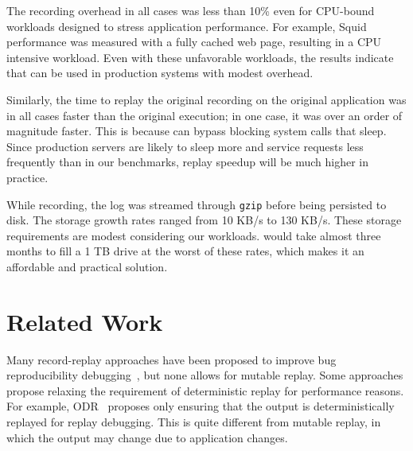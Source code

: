 The recording overhead in all cases was less than
10\% even for CPU-bound workloads designed to stress application
performance. For example, Squid performance was measured with a fully
cached web page, resulting in a CPU
intensive workload. Even with these unfavorable workloads, the results indicate
that {\dora} can be used in production systems with modest overhead.

Similarly, the time to replay the original recording on the original application
was in all cases faster than the original execution; in one case, it was over an
order of magnitude faster.
This is because {\dora} can bypass blocking system calls that sleep.
Since production servers are likely to sleep more and
service requests less frequently than in our benchmarks, replay
speedup will be much higher in practice.

While recording, the log was streamed through {\tt gzip} before being persisted to
disk. The storage growth rates ranged from 10 KB/s to 130 KB/s. These
storage requirements are modest considering our workloads. {\dora}
would take almost three months to fill a 1 TB drive at the worst
of these rates, which makes it an affordable and practical solution.

\section{Related Work}
\label{dora:sec:related}

Many record-replay approaches have been proposed to improve bug 
reproducibility
debugging~\cite{idna:vee06,decouple:usenix08,instant-replay,r2:osdi,odr:sosp09,pinsel:pldi07,pres:sosp09,jockey,srinivasan:flashback,subhraveti:sigmetrics11},
but none allows for mutable replay. Some
approaches
propose relaxing the requirement of deterministic replay for performance
reasons. For example, ODR~\cite{odr:sosp09} proposes only ensuring that the
output is deterministically replayed for replay debugging. This is
quite different from mutable replay, in which the output may
change due to application changes.

